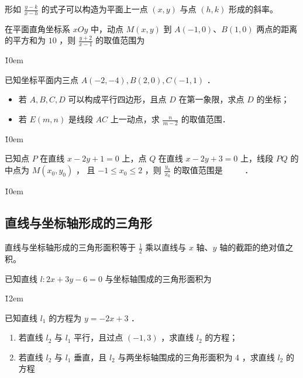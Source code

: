 \begin{theorem}
    形如 $\frac{y-k}{x-h}$ 的式子可以构造为平面上一点 $(x,y)$ 与点 $(h,k)$ 形成的斜率。
\end{theorem}

\begin{example}
    在平面直角坐标系 $x O y$ 中，动点 $M(x, y)$ 到 $A(-1,0)$、$B(1,0)$ 两点的距离的平方和为 $10$ ，则 $\frac{y+2}{x-1}$ 的取值范围为 \underline{\qquad}
\end{example}

\v{10em}

\begin{example}
    已知坐标平面内三点 $A(-2,-4), B(2,0), C(-1,1)$ ．
    \begin{itemize}
        \item[(1)] 若 $A, B, C, D$ 可以构成平行四边形，且点 $D$ 在第一象限，求点 $D$ 的坐标；
        \item[(2)] 若 $E(m, n)$ 是线段 $A C$ 上一动点，求 $\frac{n}{m-2}$ 的取值范围．
    \end{itemize}
\end{example}

\v{10em}

\begin{example}
    已知点 $P$ 在直线 $x-2 y+1=0$ 上，点 $Q$ 在直线 $x-2 y+3=0$ 上，线段 $P Q$ 的中点为 $M\left(x_0, y_0\right)$ ，
    且 $-1 \leqslant x_0 \leqslant 2$ ，则 $\frac{y_0}{x_0}$ 的取值范围是 $\qquad$ ．
\end{example}

\v{10em}

\subsection{直线与坐标轴形成的三角形}

\begin{theorem}
    直线与坐标轴形成的三角形面积等于 $\frac{1}{2}$ 乘以直线与 $x$ 轴、$y$ 轴的截距的绝对值之积。
\end{theorem}

\begin{example}
    已知直线 $l: 2 x+3 y-6=0$ 与坐标轴围成的三角形面积为 \underline{\qquad}
\end{example}

\v{12em}

\begin{example}
    已知直线 $l_1$ 的方程为 $y=-2 x+3$ ．
    \begin{enumerate}
        \item 若直线 $l_2$ 与 $l_1$ 平行，且过点 $(-1,3)$ ，求直线 $l_2$ 的方程；
        \item 若直线 $l_2$ 与 $l_1$ 垂直，且 $l_2$ 与两坐标轴围成的三角形面积为 4 ，求直线 $l_2$ 的方程
    \end{enumerate}
\end{example}

